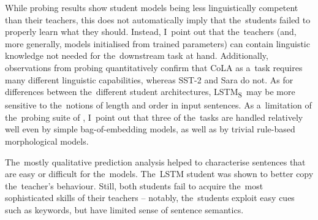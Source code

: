 \documentclass[bsc,frontabs,singlespacing,parskip,deptreport]{infthesis}
\def\LSTMS{LSTM\textsubscript{S}}
\begin{document}
{{    While probing results show student models being less linguistically competent than their teachers, this does not automatically imply that the~students failed to properly learn what they should. Instead, I~point out that the~teachers (and, more generally, models initialised from trained parameters) can contain linguistic knowledge not needed for the~downstream task at hand.
    Additionally, observations from probing quantitatively confirm that CoLA as a~task requires many different linguistic capabilities, whereas SST-2 and Sara do not.
    As for differences between the~different student architectures, \LSTMS~may be more sensitive to the~notions of length and order in input sentences.
    As a~limitation of the~probing suite of \citet{Conneau_2018}, I~point out that three of the~tasks are handled relatively well even by simple bag-of-embedding models, as well as by trivial rule-based morphological models.

    The~mostly qualitative prediction analysis helped to characterise sentences that are easy or difficult for the~models.
    The~LSTM student was shown to better copy the~teacher's behaviour.
    Still, both students fail to acquire the~most sophisticated skills of their teachers -- notably, the~students exploit easy cues such as keywords, but have limited sense of sentence semantics.
  }
}
\end{document}
